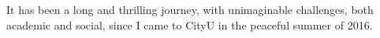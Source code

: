 
\begin{acknowledgements}

It has been a long and thrilling journey, with unimaginable challenges, both academic and social, since I came to CityU in the peaceful summer of 2016.

\end{acknowledgements}
